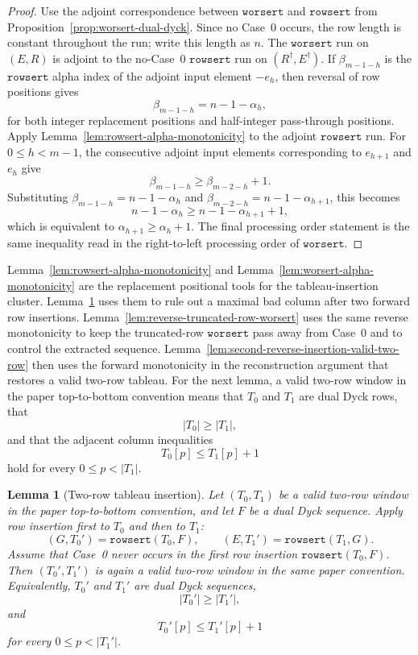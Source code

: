 \documentclass[11pt]{article}
\theoremstyle{plain}
\newtheorem{lemma}[theorem]{Lemma}
\theoremstyle{definition}
\theoremstyle{remark}
\newcommand{\rowsert}{\texttt{rowsert}}
\newcommand{\worsert}{\texttt{worsert}}
\begin{document}
\begin{proof}
Use the adjoint correspondence between \(\worsert\) and \(\rowsert\) from
Proposition~\ref{prop:worsert-dual-dyck}.  Since no Case~0 occurs, the row
length is constant throughout the run; write this length as \(n\).  The
\(\worsert\) run on \((E,R)\) is adjoint to the no-Case~0 \(\rowsert\) run on
\((R^\dagger,E^\dagger)\).  If \(\beta_{m-1-h}\) is the \(\rowsert\) alpha index
of the adjoint input element \(-e_h\), then reversal of row positions gives
\[
  \beta_{m-1-h}=n-1-\alpha_h,
\]
for both integer replacement positions and half-integer pass-through positions.
Apply Lemma~\ref{lem:rowsert-alpha-monotonicity} to the adjoint \(\rowsert\)
run.  For \(0\le h<m-1\), the consecutive adjoint input elements corresponding
to \(e_{h+1}\) and \(e_h\) give
\[
  \beta_{m-1-h}\ge \beta_{m-2-h}+1.
\]
Substituting \(\beta_{m-1-h}=n-1-\alpha_h\) and
\(\beta_{m-2-h}=n-1-\alpha_{h+1}\), this becomes
\[
  n-1-\alpha_h\ge n-1-\alpha_{h+1}+1,
\]
which is equivalent to \(\alpha_{h+1}\ge \alpha_h+1\).  The final processing
order statement is the same inequality read in the right-to-left processing
order of \(\worsert\).
\end{proof}
Lemma~\ref{lem:rowsert-alpha-monotonicity} and
Lemma~\ref{lem:worsert-alpha-monotonicity} are the replacement positional tools
for the tableau-insertion cluster.  Lemma~\ref{lem:two-row-tableau-insertion}
uses them to rule out a maximal bad column after two forward row insertions.
Lemma~\ref{lem:reverse-truncated-row-worsert} uses the same reverse monotonicity
to keep the truncated-row \(\worsert\) pass away from Case~0 and to control the
extracted sequence.  Lemma~\ref{lem:second-reverse-insertion-valid-two-row} then
uses the forward monotonicity in the reconstruction argument that restores a
valid two-row tableau.
For the next lemma, a valid two-row window in the paper top-to-bottom convention
means that \(T_0\) and \(T_1\) are dual Dyck rows, that
\[
  |T_0|\ge |T_1|,
\]
and that the adjacent column inequalities
\[
  T_0[p]\le T_1[p]+1
\]
hold for every \(0\le p<|T_1|\).
\begin{lemma}[Two-row tableau insertion]
\label{lem:two-row-tableau-insertion}
Let \((T_0,T_1)\) be a valid two-row window in the paper top-to-bottom
convention, and let \(F\) be a dual Dyck sequence.  Apply row insertion first to
\(T_0\) and then to \(T_1\):
\[
  (G,T_0')=\rowsert(T_0,F),
  \qquad
  (E,T_1')=\rowsert(T_1,G).
\]
Assume that Case~0 never occurs in the first row insertion \(\rowsert(T_0,F)\).
Then \((T_0',T_1')\) is again a valid two-row window in the same paper
convention.  Equivalently, \(T_0'\) and \(T_1'\) are dual Dyck sequences,
\[
  |T_0'|\ge |T_1'|,
\]
and
\[
  T_0'[p]\le T_1'[p]+1
\]
for every \(0\le p<|T_1'|\).
\end{lemma}
\end{document}
